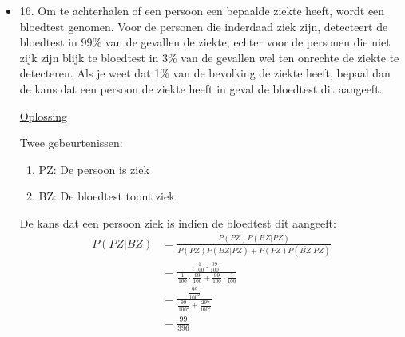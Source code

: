 \documentclass[12pt]{report}
\newcommand{\exercise}[2]{
  #1
  

  \underline{Oplossing}
  
  #2
  
    \hrulefill
}
\begin{document}
\begin{itemize}[label={}]
 \item{\exercise{16. Om te achterhalen of een persoon een bepaalde ziekte heeft, wordt een bloedtest genomen. Voor de personen die inderdaad ziek zijn, detecteert de bloedtest in 99\% van de gevallen de ziekte; echter voor de personen die niet zijk zijn blijk te bloedtest in 3\% van de gevallen wel ten onrechte de ziekte te detecteren. Als je weet dat 1\% van de bevolking de ziekte heeft, bepaal dan de kans dat een persoon de ziekte heeft in geval de bloedtest dit aangeeft.}{
 Twee gebeurtenissen:\begin{enumerate}
                      \item PZ: De persoon is ziek
                      \item BZ: De bloedtest toont ziek
                     \end{enumerate}
  De kans dat een persoon ziek is indien de bloedtest dit aangeeft:
  \begin{equation*}
   \begin{split}
    P(PZ|BZ) & = \frac{P(PZ)P(BZ|PZ)}{P(PZ)P(BZ|PZ) + P(PZ)P(\overline{BZ}|PZ)} \\
             & = \frac{\frac{1}{100}\cdot\frac{99}{100}}{\frac{1}{100}\cdot\frac{99}{100} + \frac{99}{100}\cdot\frac{3}{100}} \\
             & = \frac{\frac{99}{100^2}}{\frac{99}{100^2} + \frac{297}{100^2}} \\
             & = \frac{99}{396}
   \end{split}
  \end{equation*}


 
 }}
\end{itemize}
\end{document}
